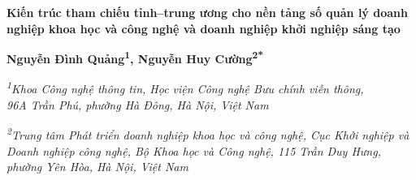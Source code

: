 
\begin{center}
{\bfseries
Kiến trúc tham chiếu tỉnh--trung ương cho nền tảng số quản lý doanh nghiệp khoa học và công nghệ và doanh nghiệp khởi nghiệp sáng tạo\par}
\vspace{0.45em}
{\bfseries Nguyễn Đình Quảng\textsuperscript{1}, Nguyễn Huy Cường\textsuperscript{2*}\par}
\vspace{0.35em}
{\itshape
\textsuperscript{1}Khoa Công nghệ thông tin, Học viện Công nghệ Bưu chính viễn thông,\\
96A Trần Phú, phường Hà Đông, Hà Nội, Việt Nam\par}
\vspace{0.2em}
{\itshape
\textsuperscript{2}Trung tâm Phát triển doanh nghiệp khoa học và công nghệ, Cục Khởi nghiệp và Doanh nghiệp công nghệ, Bộ Khoa học và Công nghệ, 115 Trần Duy Hưng, phường Yên Hòa, Hà Nội, Việt Nam\par}
\end{center}

\begingroup
\renewcommand{\thefootnote}{*}
\endgroup
